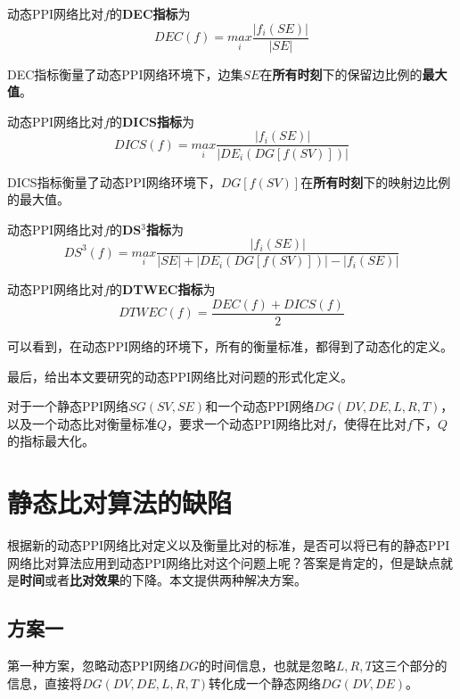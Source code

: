 \begin{defn}
\label{defndec}
动态PPI网络比对$f$的\textbf{DEC指标}为
$$DEC(f)=\underset{i}{max}\frac{\left | f_i(SE) \right |}{\left | SE \right |}$$
\end{defn}

DEC指标衡量了动态PPI网络环境下，边集$SE$在\textbf{所有时刻}下的保留边比例的\textbf{最大值}。

\begin{defn}
\label{defndics}
动态PPI网络比对$f$的\textbf{DICS指标}为$$DICS(f)=\underset{i}{max}\frac{\left | f_i(SE) \right |}{\left |DE_i(DG[f(SV)])\right |}$$
\end{defn}

DICS指标衡量了动态PPI网络环境下，$DG[f(SV)]$在\textbf{所有时刻}下的映射边比例的最大值。

\begin{defn}
\label{defnds3}
动态PPI网络比对$f$的\textbf{DS}$^3$\textbf{指标}为
$$DS^{3}(f)=\underset{i}{max}\frac{\left | f_i(SE) \right |}{\left | SE \right |+\left |DE_i(DG[f(SV)]) \right |-\left | f_i(SE) \right |}$$
\end{defn}


\begin{defn}
\label{defndtwec}
动态PPI网络比对$f$的\textbf{DTWEC指标}为$$DTWEC(f)=\frac{DEC(f)+DICS(f)}{2}$$
\end{defn}

可以看到，在动态PPI网络的环境下，所有的衡量标准，都得到了动态化的定义。

最后，给出本文要研究的动态PPI网络比对问题的形式化定义。

\begin{prob}[动态PPI网络比对问题]
\label{probdgna}
对于一个静态PPI网络$SG(SV,SE)$和一个动态PPI网络$DG(DV,DE,L,R,T)$，以及一个动态比对衡量标准$Q$，要求一个动态PPI网络比对$f$，使得在比对$f$下，$Q$的指标最大化。
\end{prob}
\section{静态比对算法的缺陷}
根据新的动态PPI网络比对定义以及衡量比对的标准，是否可以将已有的静态PPI网络比对算法应用到动态PPI网络比对这个问题上呢？答案是肯定的，但是缺点就是\textbf{时间}或者\textbf{比对效果}的下降。本文提供两种解决方案。

\subsection{方案一}
第一种方案，忽略动态PPI网络$DG$的时间信息，也就是忽略$L,R,T$这三个部分的信息，直接将$DG(DV,DE,L,R,T)$转化成一个静态网络$DG(DV,DE)$。

